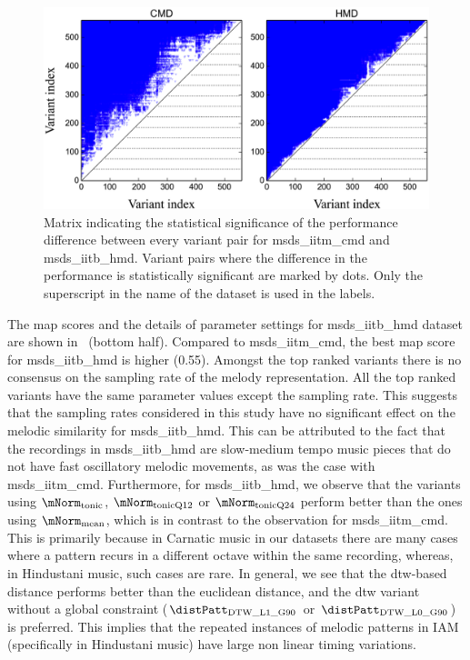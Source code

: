 \begin{figure}
	\begin{center}
		\includegraphics[width=\figSizeEightyFive]{ch06_patterns/figures/SimilarityEvaluation/StatisticalDiff.png}
	\end{center}
	\caption{Matrix indicating the statistical significance of the performance difference between every variant pair for \acrshort{msds_iitm_cmd} and \acrshort{msds_iitb_hmd}. Variant pairs where the difference in the performance is statistically significant are marked by dots. Only the superscript in the name of the dataset is used in the labels.}
	\label{fig:patterns_statistical_significance_similarity_evaluation}
\end{figure}


The \gls{map} scores and the details of parameter settings for \acrshort{msds_iitb_hmd} dataset are shown in~ (bottom half). Compared to \acrshort{msds_iitm_cmd}, the best \gls{map} score for \acrshort{msds_iitb_hmd} is higher (0.55). Amongst the top ranked variants there is no consensus on the sampling rate of the melody representation. All the top ranked variants have the same parameter values except the sampling rate. This suggests that the sampling rates considered in this study have no significant effect on the melodic similarity for \acrshort{msds_iitb_hmd}. This can be attributed to the fact that the recordings in \acrshort{msds_iitb_hmd} are slow-medium tempo music pieces that do not have fast oscillatory melodic movements, as was the case with \acrshort{msds_iitm_cmd}.  Furthermore, for \acrshort{msds_iitb_hmd}, we observe that the variants using $\mNorm_{\mathrm{tonic}}$, $\mNorm_{\mathrm{tonicQ12}}$ or $\mNorm_{\mathrm{tonicQ24}}$ perform better than the ones using $\mNorm_{\mathrm{mean}}$, which is in contrast to the observation for \acrshort{msds_iitm_cmd}. This is primarily because in Carnatic music in our datasets there are many cases where a pattern recurs in a different octave within the same recording, whereas, in Hindustani music, such cases are rare. In general, we see that the \gls{dtw}-based distance performs better than the euclidean distance, and the \gls{dtw} variant without a global constraint ($\distPatt_{\mathrm{DTW\_L1\_G90}}$ or $\distPatt_{\mathrm{DTW\_L0\_G90}}$) is preferred. This implies that the repeated instances of melodic patterns in IAM (specifically in Hindustani music) have large non linear timing variations.

